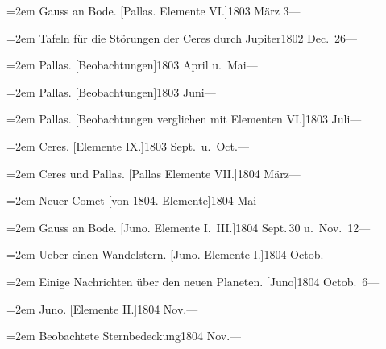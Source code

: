 \documentclass[12pt,a4paper]{article}
\begin{document}
{{{\vspace{0.5mm}
\noindent\hangindent=2em
Gauss an Bode. [Pallas. Elemente VI.]\hfill 1803 M\"arz 3\quad ---

\vspace{0.5mm}
\noindent\hangindent=2em
Tafeln f\"ur die St\"orungen der Ceres durch Jupiter\hfill 1802 Dec.\ 26\quad ---

\vspace{0.5mm}
\noindent\hangindent=2em
Pallas. [Beobachtungen]\hfill 1803 April u.\ Mai\quad ---

\vspace{0.5mm}
\noindent\hangindent=2em
Pallas. [Beobachtungen]\hfill 1803 Juni\quad ---

\vspace{0.5mm}
\noindent\hangindent=2em
Pallas. [Beobachtungen verglichen mit Elementen VI.]\hfill 1803 Juli\quad ---

\vspace{0.5mm}
\noindent\hangindent=2em
Ceres. [Elemente IX.]\hfill 1803 Sept.\ u.\ Oct.\quad ---

\vspace{0.5mm}
\noindent\hangindent=2em
Ceres und Pallas. [Pallas Elemente VII.]\hfill 1804 M\"arz\quad ---

\vspace{0.5mm}
\noindent\hangindent=2em
Neuer Comet [von 1804. Elemente]\hfill 1804 Mai\quad ---

\vspace{0.5mm}
\noindent\hangindent=2em
Gauss an Bode. [Juno. Elemente I.\ III.]\hfill 1804 Sept.\,30 u.\ Nov.\ 12\quad ---

\vspace{0.5mm}
\noindent\hangindent=2em
Ueber einen Wandelstern. [Juno. Elemente I.]\hfill 1804 Octob.\quad ---

\vspace{0.5mm}
\noindent\hangindent=2em
Einige Nachrichten \"uber den neuen Planeten. [Juno]\hfill 1804 Octob.\ 6\quad ---

\vspace{0.5mm}
\noindent\hangindent=2em
Juno. [Elemente II.]\hfill 1804 Nov.\quad ---

\vspace{0.5mm}
\noindent\hangindent=2em
Beobachtete Sternbedeckung\hfill 1804 Nov.\quad ---

}}}
\end{document}
